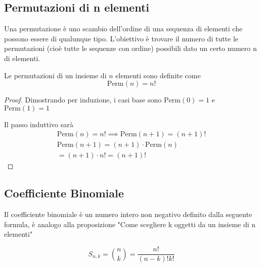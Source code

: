 \subsection{Permutazioni di n elementi}

\begin{defn}
	Una permutazione è uno scambio dell'ordine di una sequenza di elementi che possono essere di qualunque tipo. L'obiettivo è trovare il numero di tutte le permutazioni (cioè tutte le sequenze con ordine) possibili dato un certo numero n di elementi.
	
	Le permutazioni di un insieme di $ n $ elementi sono definite come
	\begin{equation}
	\text{Perm}(n) = n!
	\end{equation}
\end{defn}

\begin{proof}
	Dimostrando per induzione, i casi base sono $ \text{Perm}(0) = 1 $ e $ \text{Perm}(1) = 1 $
	
	Il passo induttivo sarà 
	\begin{equation*}
		\begin{aligned}
			\text{Perm}(n) = n! \implies \text{Perm}(n+1) = (n+1)! \\
			\text{Perm}(n+1) = (n+1) \cdot \text{Perm}(n) \\
			= (n+1) \cdot n! = (n+1)!
		\end{aligned}
	\end{equation*}
\end{proof}

\subsection{Coefficiente Binomiale}

\begin{defn}
	Il coefficiente binomiale è un numero intero non negativo definito dalla seguente formula, è analogo alla proposizione "Come scegliere k oggetti da un insieme di n elementi"
	
	\begin{equation}
		S_{n,k} = \binom{n}{k} = \dfrac{n!}{(n-k)!k!}
	\end{equation}
\end{defn}

